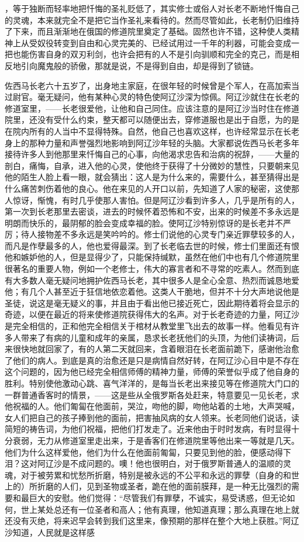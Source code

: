 ，等于独断而轻率地把忏悔的圣礼贬低了，其实修士或俗人对长老不断地忏悔自己的灵魂，本来就完全不是把它当作圣礼来看待的。然而尽管如此，长老制仍旧维持了下来，而且渐渐地在俄国的修道院里奠定了基础。固然也许不错，这种使人类精神上从受奴役转变到自由和心灵完美的、已经试用过一千年的利器，可能会变成一把也能伤害自身的双刃利剑，也许会把有的人不是引向驯顺和完全的克己，而是相反地引向魔鬼般的骄傲，那就是说，不是得到自由，却是得到了锁链。
\par 佐西马长老六十五岁了，出身地主家庭，在很年轻的时候曾是个军人，在高加索当过尉官。毫无疑问，他有某种心灵的特色使阿辽沙深为惊佩。阿辽沙就住在长老的修道室里，——长老很爱他，让他和自己同住。应该注意的是阿辽沙当时住在修道院里，还没有受什么约束，整天都可以随便出去，穿修道服也是出于自愿，为的是在院内所有的人当中不显得特殊。自然，他自己也喜欢这样，也许经常显示在长老身上的那种力量和声誉强烈地影响到阿辽沙年轻的头脑。大家都说佐西马长老多年接待许多人到他那里来忏悔自己的心事，向他渴求忠告和治病的祝辞，——大量的剖白，痛悔，自承，进入他的心灵，使他终于获得了十分微妙的慧性，只要朝来见他的陌生人脸上看一眼，就会猜出：这人是为什么来的，需要什么，甚至猜得出是什么痛苦刺伤着他的良心。他在来见的人开口以前，先知道了人家的秘密，这使那人惊讶，惭愧，有时几乎使那人害怕。但是阿辽沙看到许多人，几乎是所有的人，第一次到长老那里去密谈，进去的时候怀着恐怖和不安，出来的时候差不多永远是明朗而快乐的，最阴郁的脸会变成幸福的脸。使阿辽沙特别惊讶的是长老并不严厉；待人接物差不多永远是笑吟吟的。修士们说他的心灵专门亲近罪孽较多的人，而凡是作孽最多的人，他也爱得最深。到了长老临去世的时候，修士们里面还有恨他和嫉妒他的人，但是显得少了，只能保持缄默，虽然在他们中也有几个修道院里很著名的重要人物，例如一个老修士，伟大的寡言者和不寻常的吃素人。然而到底有大多数人毫无疑问地拥护佐西马长老，其中很多人是全心全意、热烈而诚恳地爱他；有几个人甚至近于狂信地依恋着他。这类人干脆地，但并不十分大声地说他是圣徒，说这是毫无疑义的事，并且由于看出他已接近死亡，因此期待着将会显示的奇迹，以便在最近的将来使修道院获得伟大的名声。对于长老奇迹的力量，阿辽沙是完全相信的，正和他完全相信关于棺材从教堂里飞出去的故事一样。他看见有许多人带来了有病的儿童和成年的亲属，恳求长老抚他们的头顶，为他们读祷词，后来很快地就回家了，有的人第二天就回来，含着眼泪在长老面前跪下，感谢他治愈了他们的病人。到底是真的治愈还是只是病情自然好转，在阿辽沙心目中是不存在这个问题的，因为他已经完全相信师傅的精神力量，师傅的荣誉似乎成了他自身的胜利。特别使他激动心跳、喜气洋洋的，是每当长老出来接见等在修道院大门口的一群普通香客时的情景，——这是些从全俄罗斯各处赶来，特意要见一见长老，求他祝福的人。他们匍匐在他面前，哭泣，吻他的脚，吻他站着的土地，大声哭喊，女人们把自己的孩子捧到他的面前，把害抽风病的女人领来。长老同他们说话，读简短的祷告词，为他们祝福，把他们打发走了。近来他由于时时发病，有时显得十分衰弱，无力从修道室里走出来，于是香客们在修道院里等他出来一等就是几天。他们为什么这样爱他，他们为什么在他面前匍匐，只要见到他的脸，便感动得下泪？这对阿辽沙是不成问题的。噢！他也很明白，对于俄罗斯普通人的温顺的灵魂，对于被劳累和忧愁所折磨，特别是被永远的不公平和永远的罪孽（自身的和世上的）所折磨的人们，见到圣物或圣者，跪在他的面前膜拜，是一种无比强烈的需要和最巨大的安慰。他们觉得：“尽管我们有罪孽，不诚实，易受诱惑，但无论如何，世上某处总还有一位圣者和高人；他有真理，他知道真理；那么真理在地上就还没有灭绝，将来迟早会转到我们这里来，像预期的那样在整个大地上获胜。”阿辽沙知道，人民就是这样感